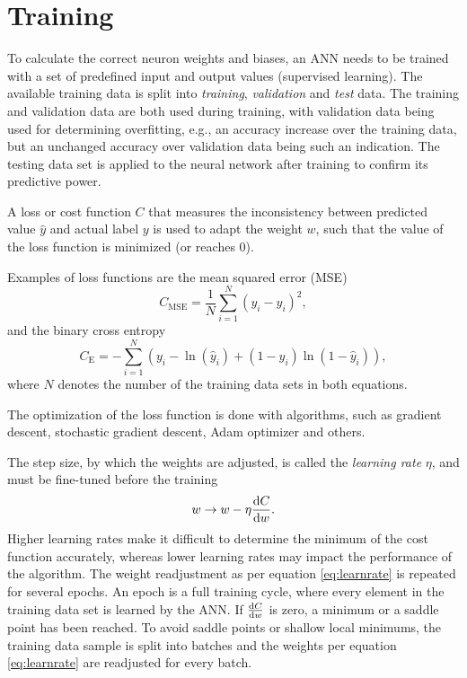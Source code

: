 \section{Training}
To calculate the correct neuron weights and biases, an ANN needs to be trained with a set of predefined input and output values (supervised learning). The available training data is split into \emph{training}, \emph{validation} and \emph{test} data. The training and validation data are both used during training, with validation data being used for determining overfitting, e.g., an accuracy increase over the training data, but an unchanged accuracy over validation data being such an indication. The testing data set is applied to the neural network after training to confirm its predictive power.

A loss or cost function $C$ that measures the inconsistency between predicted value $\hat{y}$ and actual label $y$ is used to adapt the weight $w$, such that the value of the loss function is minimized (or reaches 0). 

Examples of loss functions are the mean squared error (MSE)
\begin{equation}\label{eq:mse}
C_{\text{MSE}}=\frac{1}{N} \sum_{i=1}^N (y_i-\hat{y}_i)^2,
\end{equation}
and the binary cross entropy
\begin{equation}\label{eq:cross_entropy}
C_{\text{E}}=-\sum_{i=1}^N \left(y_i-\ln{(\hat{y}_i)+(1-y_i)\ln{(1-\hat{y}_i)}}\right),
\end{equation}
where $N$ denotes the number of the training data sets in both equations.

The optimization of the loss function is done with algorithms, such as gradient descent, stochastic gradient descent, Adam optimizer \cite{DBLP:journals/corr/KingmaB14} and others.

The step size, by which the weights are adjusted, is called the \emph{learning rate} $\eta$, and must be fine-tuned before the training
\begin{equation}\label{eq:learnrate}
    w \rightarrow w - \eta \dv{C}{w}.
\end{equation}
Higher learning rates make it difficult to determine the minimum of the cost function accurately, whereas lower learning rates may impact the performance of the algorithm. The weight readjustment as per equation \ref{eq:learnrate} is repeated for several epochs. An epoch is a full training cycle, where every element in the training data set is learned by the ANN. If $\dv{C}{w}$ is zero, a minimum or a saddle point has been reached. To avoid saddle points or shallow local minimums, the training data sample is split into batches and the weights per equation \ref{eq:learnrate} are readjusted for every batch.

